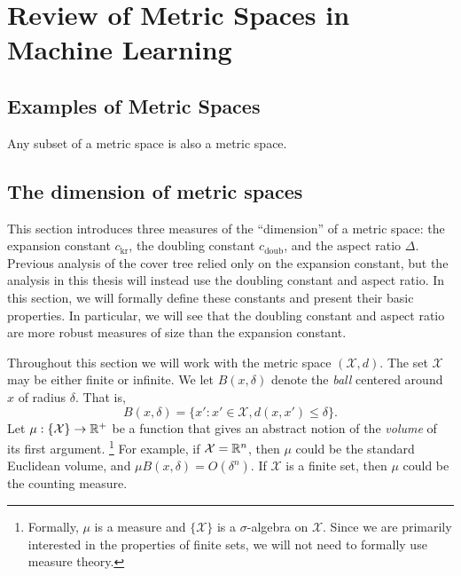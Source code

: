 \documentclass[../main.tex]{subfiles}
\newcommand{\set}[1]{\mathcal {#1}}
\newcommand{\dist}[2]{\distf({#1},{#2})}
\newcommand{\distf}{d}
\newcommand{\aspect}[1]{\Delta}
\newcommand{\krnum}{c_\text{kr}}
\newcommand{\doubnum}{c_\text{doub}}
\begin{document}

\section{Review of Metric Spaces in Machine Learning}


\subsection{Examples of Metric Spaces}

\begin{example}
    Any subset of a metric space is also a metric space.
\end{example}


\subsection{The dimension of metric spaces}

This section introduces three measures of the ``dimension'' of a metric space:
the expansion constant $\krnum$, the doubling constant $\doubnum$, and the aspect ratio $\aspect{}$.
Previous analysis of the cover tree relied only on the expansion constant,
but the analysis in this thesis will instead use the doubling constant and aspect ratio.
In this section, we will formally define these constants and present their basic properties.
In particular, we will see that the doubling constant and aspect ratio are more robust measures of size than the expansion constant.

Throughout this section we will work with the metric space $(\set X,d)$.
The set $\set X$ may be either finite or infinite.
We let $B(x,\delta)$ denote the \emph{ball} centered around $x$ of radius $\delta$. 
That is,
\begin{equation}
    B(x,\delta) = \{ x' : x'\in\set X, \dist{x}{x'} \le \delta \}.
\end{equation}
Let $\mu : \{\set X\} \to \R^+$ be a function that gives an abstract notion of the \emph{volume} of its first argument.%
\footnote{
    Formally, $\mu$ is a measure and $\{\set X\}$ is a $\sigma$-algebra on $\set X$.
    Since we are primarily interested in the properties of finite sets,
    we will not need to formally use measure theory.
}
For example, if $\set X=\R^n$, then $\mu$ could be the standard Euclidean volume,
and $\mu B(x,\delta) = O(\delta^n)$.
If $\set X$ is a finite set, then $\mu$ could be the counting measure.
\end{document}
